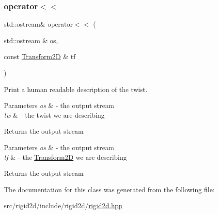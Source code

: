 \subsubsection{\texorpdfstring{operator$<$$<$}{operator<<}}
{\footnotesize\ttfamily std\+::ostream\& operator$<$$<$ (\begin{DoxyParamCaption}\item[{std\+::ostream \&}]{os,  }\item[{const \hyperlink{classrigid2d_1_1Transform2D}{Transform2D} \&}]{tf }\end{DoxyParamCaption})\hspace{0.3cm}{\ttfamily [friend]}}



Print a human readable description of the twist. 


\begin{DoxyParams}{Parameters}
{\em os} & -\/ the output stream \\
\hline
{\em tw} & -\/ the twist we are describing \\
\hline
\end{DoxyParams}
\begin{DoxyReturn}{Returns}
the output stream
\end{DoxyReturn}

\begin{DoxyParams}{Parameters}
{\em os} & -\/ the output stream \\
\hline
{\em tf} & -\/ the \hyperlink{classrigid2d_1_1Transform2D}{Transform2D} we are describing \\
\hline
\end{DoxyParams}
\begin{DoxyReturn}{Returns}
the output stream 
\end{DoxyReturn}


The documentation for this class was generated from the following file\+:\begin{DoxyCompactItemize}
\item 
src/rigid2d/include/rigid2d/\hyperlink{rigid2d_8hpp}{rigid2d.\+hpp}\end{DoxyCompactItemize}
